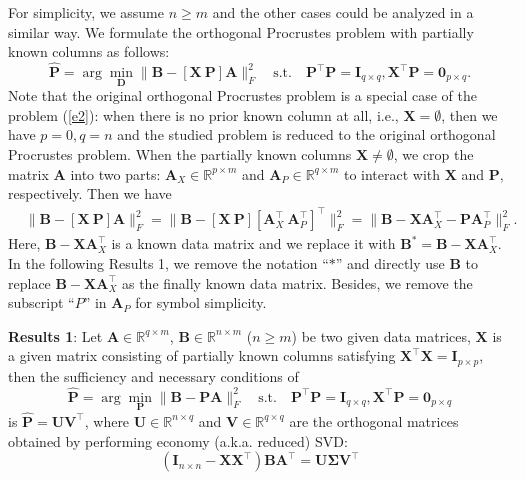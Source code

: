\documentclass[titlepage,11pt,twoside]{article}
\let\oldemptyset\emptyset
\let\emptyset\varnothing
\begin{document}
For simplicity, we assume $n\ge m$ and the other cases could be analyzed in a similar way. We formulate the orthogonal Procrustes problem with partially known columns as follows:
\begin{equation}\label{e2}
\mathbf{\hat{P}}=\arg\min_{\mathbf{D}}\|\mathbf{B}-[\mathbf{X}\ \mathbf{P}]\mathbf{A}\|_{F}^{2}
\quad
\text{s.t.}
\quad
\mathbf{P}^{\top}\mathbf{P} = \mathbf{I}_{q\times q}, \mathbf{X}^{\top}\mathbf{P} = \mathbf{0}_{p\times q}.
\end{equation} 
Note that the original orthogonal Procrustes problem is a special case of the problem (\ref{e2}): when there is no prior known column at all, i.e., $\mathbf{X}=\oldemptyset$, then we have $p=0,q=n$ and the studied problem is reduced to the original orthogonal Procrustes problem. 
When the partially known columns $\mathbf{X}\neq\oldemptyset$, we crop the matrix $\mathbf{A}$ into two parts: $\mathbf{A}_{X}\in\mathbb{R}^{p\times m}$ and $\mathbf{A}_{P}\in\mathbb{R}^{q\times m}$ to interact with $\mathbf{X}$ and $\mathbf{P}$, respectively. Then we have 
\begin{equation}
\begin{split}
&
\|\mathbf{B}-[\mathbf{X}\ \mathbf{P}]\mathbf{A}\|_{F}^{2}
=\|\mathbf{B}-[\mathbf{X}\ \mathbf{P}][\mathbf{A}_{X}^{\top}\ \mathbf{A}_{P}^{\top}]^{\top}\|_{F}^{2}
=\|\mathbf{B}-\mathbf{X}\mathbf{A}_{X}^{\top} - \mathbf{P}\mathbf{A}_{P}^{\top}\|_{F}^{2}.
\end{split}
\end{equation}
Here, $\mathbf{B}-\mathbf{X}\mathbf{A}_{X}^{\top}$ is a known data matrix and we replace it with 
$\mathbf{B}^{*}=\mathbf{B}-\mathbf{X}\mathbf{A}_{X}^{\top}$. In the following Results 1, we remove the notation ``$*$'' and directly use $\mathbf{B}$ to replace $\mathbf{B}-\mathbf{X}\mathbf{A}_{X}^{\top}$ as the finally known data matrix. Besides, we remove the subscript ``$P$'' in $\mathbf{A}_{P}$ for symbol simplicity.

\textbf{Results 1}: Let $\mathbf{A}\in \mathbb{R}^{q\times m}$, $\mathbf{B}\in \mathbb{R}^{n\times m}$ ($n\ge m$) be two given data matrices, $\mathbf{X}$ is a given matrix consisting of partially known columns satisfying $\mathbf{X}^{\top}\mathbf{X}=\mathbf{I}_{p\times p}$, then the sufficiency and necessary conditions of
\begin{equation}\label{e4}
\mathbf{\hat{P}}=\arg\min_{\mathbf{P}}\|\mathbf{B}-\mathbf{P}\mathbf{A}\|_{F}^{2}
\quad
\text{s.t.}
\quad
\mathbf{P}^{\top}\mathbf{P} = \mathbf{I}_{q\times q}, \mathbf{X}^{\top}\mathbf{P} = \mathbf{0}_{p\times q} 
\end{equation}
is $\mathbf{\hat{P}} = \mathbf{U}\mathbf{V}^{\top}$, where $\mathbf{U}\in \mathbb{R}^{n\times q}$ and $\mathbf{V}\in \mathbb{R}^{q\times q}$ are the orthogonal matrices obtained by performing economy (a.k.a. reduced) SVD:
\begin{equation}\label{e5}
(\mathbf{I}_{n\times n}-\mathbf{X}\mathbf{X}^{\top})\mathbf{B}\mathbf{A}^{\top} = \mathbf{U}\mathbf{\mathbf{\Sigma}}\mathbf{V}^{\top}
\end{equation}
\end{document}
